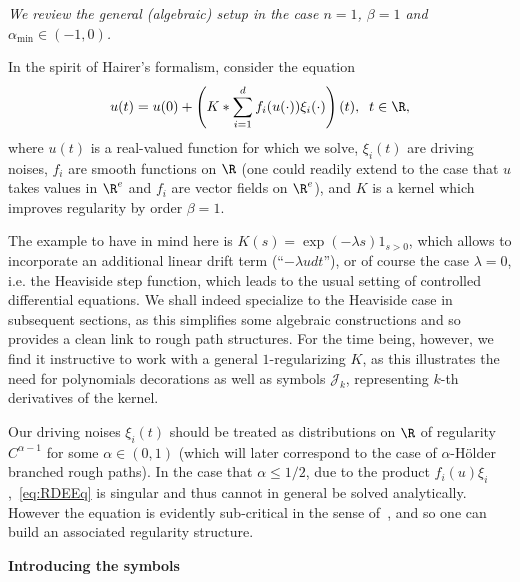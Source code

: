 \documentclass{article}
\begin{document}
{\it We review the general (algebraic) setup in the case $n=1$, $\beta = 1$ and $\alpha_{\min} \in (-1,0)$. }

\medskip

In the spirit of Hairer's formalism, consider the equation
\begin{equation}\label{eq:RDEEq}
u(t) = u(0) + \left(K * \sum_{i=1}^d f_i(u(\cdot))\xi_i(\cdot) \right)(t), \; \; t \in \R,
\end{equation}
where $u(t)$ is a real-valued function for which we solve, $\xi_i(t)$ are driving noises, $f_i$ are smooth functions on $\R$ (one could readily extend to the case that $u$ takes values in $\R^e$ and $f_i$ are vector fields on $\R^e$), and $K$ is a kernel which improves regularity by order $\beta = 1$.

\begin{remark}
The example to have in mind here is $K(s) = \exp (- \lambda s) 1_{s>0}$, which allows to incorporate an additional linear drift term (``$-\lambda u dt$''), or of course the case 
$\lambda =0$, i.e. the Heaviside step function, which leads to the usual setting of controlled differential equations. We shall indeed specialize to the Heaviside case in subsequent
sections, as this simplifies some algebraic constructions and so provides a clean link to rough path structures. For the time being, however, we find it instructive to work
with a general $1$-regularizing $K$, as this illustrates the need for polynomials decorations as well as symbols $\mathcal{J}_k$, representing $k$-th derivatives of the kernel.
\end{remark}


Our driving noises $\xi_i(t)$ should be treated as distributions on $\R$ of regularity $C^{\alpha-1}$ for some $\alpha \in (0, 1)$ (which will later correspond to the case of $\alpha$-H{\"o}lder branched rough paths). In the case that $\alpha \leq 1/2$, due to the product $f_i(u)\xi_i$,~\eqref{eq:RDEEq} is singular and thus cannot in general be solved analytically. However the equation is evidently sub-critical in the sense of~\cite{Hairer14}, and so one can build an associated regularity structure.

\medskip

{\bf Introducing the symbols} 

\medskip
\end{document}
